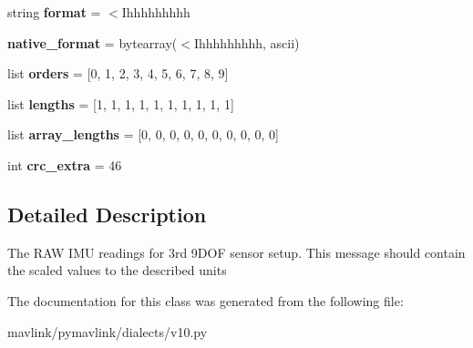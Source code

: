 \begin{DoxyCompactItemize}
\mbox{\label{classpymavlink_1_1dialects_1_1v10_1_1MAVLink__scaled__imu3__message_ac3be4b6ecb819e619e5d6aec5cd0b83e}} 
string {\bfseries format} = \textquotesingle{}$<$Ihhhhhhhhh\textquotesingle{}
\item 
\mbox{\label{classpymavlink_1_1dialects_1_1v10_1_1MAVLink__scaled__imu3__message_ac886fbcf818024fd191636aef3f87040}} 
{\bfseries native\+\_\+format} = bytearray(\textquotesingle{}$<$Ihhhhhhhhh\textquotesingle{}, \textquotesingle{}ascii\textquotesingle{})
\item 
\mbox{\label{classpymavlink_1_1dialects_1_1v10_1_1MAVLink__scaled__imu3__message_a133a282f4d9f787e6af38d39fc533207}} 
list {\bfseries orders} = \mbox{[}0, 1, 2, 3, 4, 5, 6, 7, 8, 9\mbox{]}
\item 
\mbox{\label{classpymavlink_1_1dialects_1_1v10_1_1MAVLink__scaled__imu3__message_ad66532b953ed6ca65a4701abd36aad5f}} 
list {\bfseries lengths} = \mbox{[}1, 1, 1, 1, 1, 1, 1, 1, 1, 1\mbox{]}
\item 
\mbox{\label{classpymavlink_1_1dialects_1_1v10_1_1MAVLink__scaled__imu3__message_ab24f3e23f01a7370c7587c7e54cf6627}} 
list {\bfseries array\+\_\+lengths} = \mbox{[}0, 0, 0, 0, 0, 0, 0, 0, 0, 0\mbox{]}
\item 
\mbox{\label{classpymavlink_1_1dialects_1_1v10_1_1MAVLink__scaled__imu3__message_affc5c343165b44500553ba784d1418f0}} 
int {\bfseries crc\+\_\+extra} = 46
\end{DoxyCompactItemize}


\subsection{Detailed Description}
\begin{DoxyVerb}The RAW IMU readings for 3rd 9DOF sensor setup. This message
should contain the scaled values to the described units
\end{DoxyVerb}
 

The documentation for this class was generated from the following file\+:\begin{DoxyCompactItemize}
\item 
mavlink/pymavlink/dialects/v10.\+py\end{DoxyCompactItemize}
